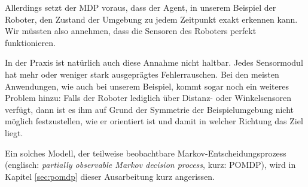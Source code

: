 \documentclass[a4paper]{IEEEtran}
\begin{document}
Allerdings setzt der MDP voraus, dass der Agent, in unserem Beispiel der Roboter, den Zustand der Umgebung zu jedem Zeitpunkt exakt erkennen kann. Wir müssten also annehmen, dass die Sensoren des Roboters perfekt funktionieren.

In der Praxis ist natürlich auch diese Annahme nicht haltbar. Jedes Sensormodul hat mehr oder weniger stark ausgeprägtes Fehlerrauschen. Bei den meisten Anwendungen, wie auch bei unserem Beispiel, kommt sogar noch ein weiteres Problem hinzu: Falls der Roboter lediglich über Distanz- oder Winkelsensoren verfügt, dann ist es ihm auf Grund der Symmetrie der Beispielumgebung nicht möglich festzustellen, wie er orientiert ist und damit in welcher Richtung das Ziel liegt.

Ein solches Modell, der teilweise beobachtbare Markov-Entscheidungsprozess (englisch: \emph{partially observable Markov decision process}, kurz: POMDP), wird in Kapitel \ref{sec:pomdp} dieser Ausarbeitung kurz angerissen.
\end{document}
